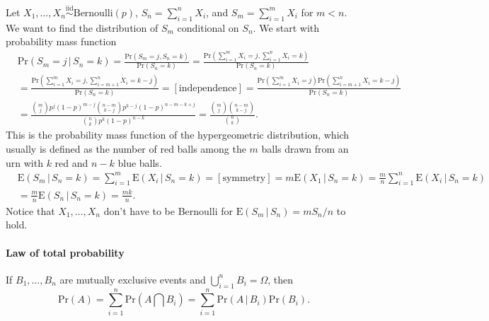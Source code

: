 \documentclass[11pt]{article}\usepackage[]{graphicx}\usepackage[]{color}
\numberwithin{algorithm}{section}
\newcommand{\cprob}[2]{\ensuremath{\text{Pr}\left(#1 \,|\,#2\right)}}
\newcommand{\prob}[1]{\ensuremath{\text{Pr}\left(#1 \right)}}
\newcommand{\cexpect}[4]{\ensuremath{\text{E}\left#3 #1 \,|\,#2\right#4}}
\newcommand{\iid}{\ensuremath{\overset{\text{iid}}{\sim}}}
\theoremstyle{remark}
\theoremstyle{definition}
\newenvironment{example}[1]{\begin{trivlist}
\item[\hskip \labelsep {\bfseries Example}: \underline{#1}]\ \\}{\end{trivlist}}
\begin{document}
\begin{example}{Hypergeometric distribution}
  Let $X_1,\dots,X_n \iid \text{Bernoulli}(p)$, $S_n=\sum_{i=1}^n X_i$, and $S_m=\sum_{i=1}^m X_i$ 
  for $m < n$. We want to find the distribution of $S_m$ conditional on $S_n$. We start with 
  probability mass function 
  \[
  \begin{split}
    &\cprob{S_m=j}{S_n=k} = \frac{\prob{S_m=j,S_n=k}}{\prob{S_n=k}} = 
    \frac{\prob{\sum_{i=1}^m X_i=j,\sum_{i=1}^n X_i=k}}{\prob{S_n=k}} \\
    &= \frac{\prob{\sum_{i=1}^m X_i=j,\sum_{i=m+1}^n X_i=k-j}}{\prob{S_n=k}} = [\text{independence}]
    = \frac{\prob{\sum_{i=1}^m X_i=j}\prob{\sum_{i=m+1}^n X_i=k-j}}{\prob{S_n=k}} \\
    &= \frac{\binom{m}{j}p^j(1-p)^{m-j}\binom{n-m}{k-j}p^{k-j}(1-p)^{n-m-k+j}}{\binom{n}{k}p^k(1-p)^{n-k}}
    = \frac{\binom{m}{j}\binom{n-m}{k-j}}{\binom{n}{k}}.
  \end{split}
  \]
  This is the probability mass function of the hypergeometric distribution, which usually is defined 
  as the number of red balls among the $m$ balls drawn from an urn with $k$ red and $n-k$ blue balls.
  \[
  \begin{split}
    &\cexpect{S_m}{S_n=k}{(}{)} = \sum_{i=1}^m \cexpect{X_i}{S_n=k}{(}{)} = [\text{symmetry}] = 
    m \cexpect{X_1}{S_n=k}{(}{)} = \frac{m}{n} \sum_{i=1}^n \cexpect{X_i}{S_n=k}{(}{)}\\ 
    &= \frac{m}{n} \cexpect{S_n}{S_n=k}{(}{)} = \frac{m k}{n}.
  \end{split}
  \]
  Notice that $X_1,\dots,X_n$ don't have to be Bernoulli for $\cexpect{S_m}{S_n}{(}{)} = m S_n /n$ to hold.
\end{example}

\paragraph{Law of total probability}If $B_1,\dots,B_n$ are mutually exclusive events and 
$\bigcup_{i=1}^n B_i = \Omega$, then
\[
\prob{A} = \sum_{i=1}^n \prob{A \bigcap B_i} = \sum_{i=1}^n \cprob{A}{B_i}\prob{B_i}.
\]
\end{document}

